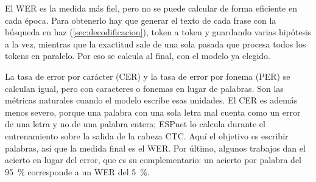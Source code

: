El WER es la medida más fiel, pero no se puede calcular de forma eficiente en cada época. Para obtenerlo hay que generar el texto de cada frase con la búsqueda en haz (\cref{sec:decodificacion}), token a token y guardando varias hipótesis a la vez, mientras que la exactitud sale de una sola pasada que procesa todos los tokens en paralelo. Por eso se calcula al final, con el modelo ya elegido.

La tasa de error por carácter (CER) y la tasa de error por fonema (PER) se calculan igual, pero con caracteres o fonemas en lugar de palabras. Son las métricas naturales cuando el modelo escribe esas unidades. El CER es además menos severo, porque una palabra con una sola letra mal cuenta como un error de una letra y no de una palabra entera; ESPnet lo calcula durante el entrenamiento sobre la salida de la cabeza CTC. Aquí el objetivo es escribir palabras, así que la medida final es el WER. Por último, algunos trabajos dan el acierto en lugar del error, que es su complementario: un acierto por palabra del \SI{95}{\percent} corresponde a un WER del \SI{5}{\percent}.
